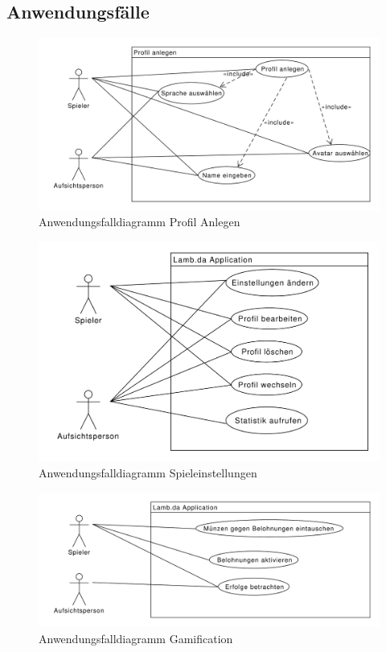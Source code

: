 \subsection{Anwendungsfälle}

\begin{figure}[H]
\centering
\includegraphics[scale=0.55]{../use_cases/create_profile.pdf}
\caption{Anwendungsfalldiagramm Profil Anlegen}
\end{figure}

\begin{figure}[H]
\centering
\includegraphics[scale=0.55]{../use_cases/game_settings.pdf}
\caption{Anwendungsfalldiagramm Spieleinstellungen}
\end{figure}

\begin{figure}[H]
\centering
\includegraphics[scale=0.55]{../use_cases/gamification.pdf}
\caption{Anwendungsfalldiagramm Gamification}
\end{figure}

